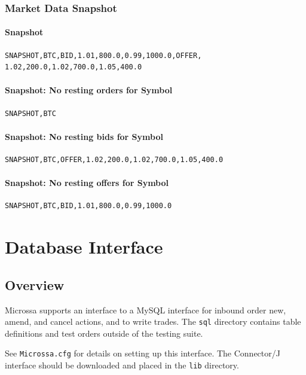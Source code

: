 \documentclass[Letter]{article}
\begin{document}
\subsubsection{Market Data Snapshot}

\paragraph{Snapshot}
\begin{verbatim}
SNAPSHOT,BTC,BID,1.01,800.0,0.99,1000.0,OFFER,
1.02,200.0,1.02,700.0,1.05,400.0
\end{verbatim}

\paragraph{Snapshot: No resting orders for Symbol}
\begin{verbatim}
SNAPSHOT,BTC
\end{verbatim}

\paragraph{Snapshot: No resting bids for Symbol}
\begin{verbatim}
SNAPSHOT,BTC,OFFER,1.02,200.0,1.02,700.0,1.05,400.0
\end{verbatim}

\paragraph{Snapshot: No resting offers for Symbol}
\begin{verbatim}
SNAPSHOT,BTC,BID,1.01,800.0,0.99,1000.0
\end{verbatim}

\newpage
\section{Database Interface}

\subsection{Overview}

Microssa supports an interface to a MySQL interface for inbound order
new, amend, and cancel actions, and to write trades.  The \texttt{sql}
directory contains table definitions and test orders outside of the testing
suite.

See \texttt{Microssa.cfg} for details on setting up this interface.  The
Connector/J interface should be downloaded and placed in the \texttt{lib}
directory.
\end{document}
